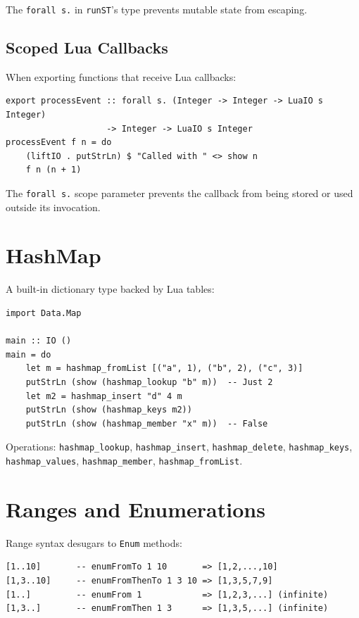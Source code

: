 \documentclass[11pt,a4paper]{article}
\begin{document}
The \texttt{forall s.} in \texttt{runST}'s type prevents mutable state
from escaping.

\subsection{Scoped Lua Callbacks}

When exporting functions that receive Lua callbacks:

\begin{lstlisting}
export processEvent :: forall s. (Integer -> Integer -> LuaIO s Integer)
                    -> Integer -> LuaIO s Integer
processEvent f n = do
    (liftIO . putStrLn) $ "Called with " <> show n
    f n (n + 1)
\end{lstlisting}

The \texttt{forall s.} scope parameter prevents the callback from being
stored or used outside its invocation.

\section{HashMap}

A built-in dictionary type backed by Lua tables:

\begin{lstlisting}
import Data.Map

main :: IO ()
main = do
    let m = hashmap_fromList [("a", 1), ("b", 2), ("c", 3)]
    putStrLn (show (hashmap_lookup "b" m))  -- Just 2
    let m2 = hashmap_insert "d" 4 m
    putStrLn (show (hashmap_keys m2))
    putStrLn (show (hashmap_member "x" m))  -- False
\end{lstlisting}

Operations: \texttt{hashmap\_lookup}, \texttt{hashmap\_insert},
\texttt{hashmap\_delete}, \texttt{hashmap\_keys}, \texttt{hashmap\_values},
\texttt{hashmap\_member}, \texttt{hashmap\_fromList}.

\section{Ranges and Enumerations}

Range syntax desugars to \texttt{Enum} methods:

\begin{lstlisting}
[1..10]       -- enumFromTo 1 10       => [1,2,...,10]
[1,3..10]     -- enumFromThenTo 1 3 10 => [1,3,5,7,9]
[1..]         -- enumFrom 1            => [1,2,3,...] (infinite)
[1,3..]       -- enumFromThen 1 3      => [1,3,5,...] (infinite)
\end{lstlisting}
\end{document}
